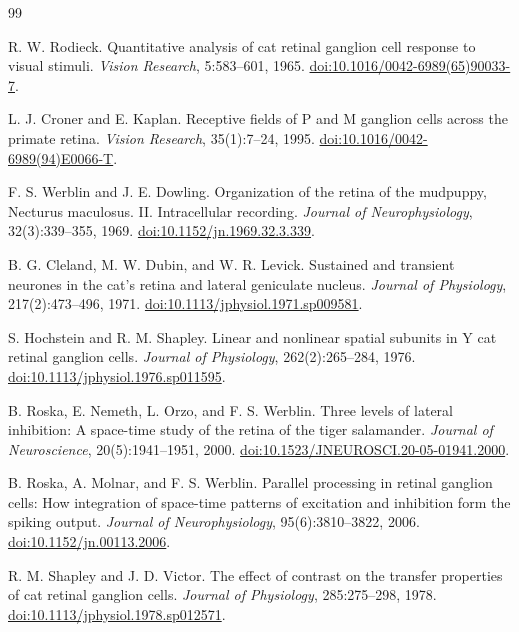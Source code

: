 \documentclass[UTF8,12pt,a4paper]{ctexart}
\numberwithin{equation}{section}
\begin{document}
\clearpage
\begin{thebibliography}{99}

R. W. Rodieck.
Quantitative analysis of cat retinal ganglion cell response to visual stimuli.
\emph{Vision Research}, 5:583--601, 1965.
\href{https://doi.org/10.1016/0042-6989(65)90033-7}{doi:10.1016/0042-6989(65)90033-7}.

L. J. Croner and E. Kaplan.
Receptive fields of P and M ganglion cells across the primate retina.
\emph{Vision Research}, 35(1):7--24, 1995.
\href{https://doi.org/10.1016/0042-6989(94)E0066-T}{doi:10.1016/0042-6989(94)E0066-T}.

F. S. Werblin and J. E. Dowling.
Organization of the retina of the mudpuppy, Necturus maculosus. II. Intracellular recording.
\emph{Journal of Neurophysiology}, 32(3):339--355, 1969.
\href{https://doi.org/10.1152/jn.1969.32.3.339}{doi:10.1152/jn.1969.32.3.339}.

B. G. Cleland, M. W. Dubin, and W. R. Levick.
Sustained and transient neurones in the cat's retina and lateral geniculate nucleus.
\emph{Journal of Physiology}, 217(2):473--496, 1971.
\href{https://doi.org/10.1113/jphysiol.1971.sp009581}{doi:10.1113/jphysiol.1971.sp009581}.

S. Hochstein and R. M. Shapley.
Linear and nonlinear spatial subunits in Y cat retinal ganglion cells.
\emph{Journal of Physiology}, 262(2):265--284, 1976.
\href{https://doi.org/10.1113/jphysiol.1976.sp011595}{doi:10.1113/jphysiol.1976.sp011595}.

B. Roska, E. Nemeth, L. Orzo, and F. S. Werblin.
Three levels of lateral inhibition: A space-time study of the retina of the tiger salamander.
\emph{Journal of Neuroscience}, 20(5):1941--1951, 2000.
\href{https://doi.org/10.1523/JNEUROSCI.20-05-01941.2000}{doi:10.1523/JNEUROSCI.20-05-01941.2000}.

B. Roska, A. Molnar, and F. S. Werblin.
Parallel processing in retinal ganglion cells: How integration of space-time patterns of excitation and inhibition form the spiking output.
\emph{Journal of Neurophysiology}, 95(6):3810--3822, 2006.
\href{https://doi.org/10.1152/jn.00113.2006}{doi:10.1152/jn.00113.2006}.

R. M. Shapley and J. D. Victor.
The effect of contrast on the transfer properties of cat retinal ganglion cells.
\emph{Journal of Physiology}, 285:275--298, 1978.
\href{https://doi.org/10.1113/jphysiol.1978.sp012571}{doi:10.1113/jphysiol.1978.sp012571}.


\end{thebibliography}
\end{document}
